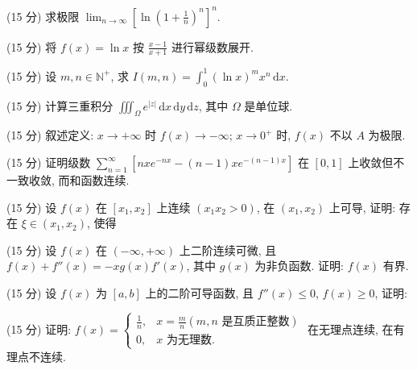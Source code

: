 (15 分) 求极限 $\lim_{n\to \infty}\left[\ln \left(1 + \frac{1}{n}\right)^n\right]^n.$\par
(15 分) 将 $f(x) = \ln x$ 按 $\frac{x - 1}{x + 1}$ 进行幂级数展开.\par
(15 分) 设 $m, n \in \mathbb{N}^{+}$, 求 $I(m, n) = \int_{0}^{1} (\ln x)^{m} x^{n} \, \mathrm{d}x$.\par
(15 分) 计算三重积分 $\iiint_{\Omega} e^{|z|} \, \mathrm{d}x \, \mathrm{d}y \, \mathrm{d}z$, 其中 $\Omega$ 是单位球.\par
(15 分) 叙述定义: $x \to +\infty$ 时 $f(x) \to -\infty$; $x \to 0^{+}$ 时, $f(x)$ 不以 $A$ 为极限.\par
(15 分) 证明级数 $\sum_{n=1}^{\infty}[nxe^{-nx} - (n-1)xe^{-(n-1)x}]$ 在 $[0,1]$ 上收敛但不一致收敛, 而和函数连续.\par
\par{}
(15 分) 设 $f(x)$ 在 $[x_1, x_2]$ 上连续 $(x_1 x_2 > 0)$, 在 $(x_1, x_2)$ 上可导, 证明: 存在 $\xi \in (x_1, x_2)$, 使得\par
\nopagebreak[4]
(15 分) 设 $f(x)$ 在 $(- \infty, + \infty)$ 上二阶连续可微, 且 $f(x) + f''(x) = -xg(x)f'(x)$, 其中 $g(x)$ 为非负函数. 证明: $f(x)$ 有界.\par
\par{}
(15 分) 设 $f(x)$ 为 $[a, b]$ 上的二阶可导函数, 且 $f''(x) \leq 0$, $f(x) \geq 0$, 证明:\par
\nopagebreak[4]
(15 分) 证明: $f(x) = \begin{cases} \frac{1}{n}, & x = \frac{m}{n} (m, n \text{ 是互质正整数}) \\ 0, & x \text{ 为无理数}. \end{cases}$ 在无理点连续, 在有理点不连续.\par

